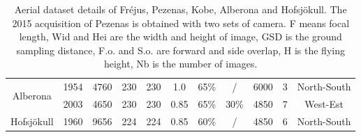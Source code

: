 \begin{table}[htbp]
\begin{tabular}{||c|c||c|c|c|c|c|c|c|c|c||}
\multirow{2}{*}{Alberona}& 1954 & 4760 & 230 & 230 & 1.0 & 65\% & / & 6000 & 3& North-South \\
& 2003 & 4650 & 230 & 230 & 0.85 & 65\% & 30\% & 4850 & 7 & West-Est \\\hline\hline

Hofsjökull & 1960 & 9656 & 224 & 224 & 0.85 & 60\% & / & 4850 & 6 & North-South \\\hline
	\end{tabular}
	\caption{Aerial dataset details of Fr{\'e}jus, Pezenas, Kobe, Alberona and Hofsjökull. The 2015 acquisition of Pezenas is obtained with two sets of camera. F means focal length, Wid and Hei are the width and height of image, GSD is the ground sampling distance, F.o. and S.o. are forward and side overlap, H is the flying height, Nb is the number of images.}
	\label{AerialData}
\end{table}



